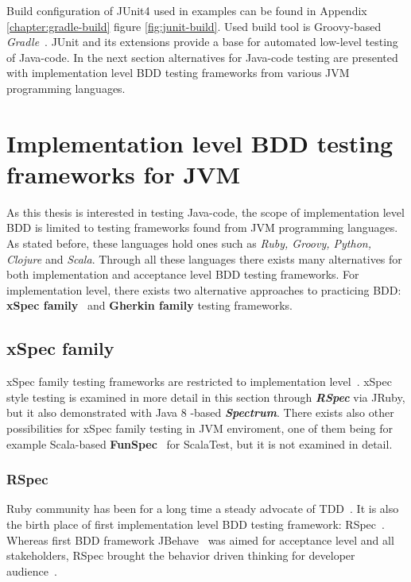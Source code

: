     Build configuration of JUnit4 used in examples can be found in Appendix \ref{chapter:gradle-build} figure \ref{fig:junit-build}.
    Used build tool is Groovy-based \textit{Gradle}~\cite{gradle}.
    JUnit and its extensions provide a base for automated low-level testing of Java-code.
    In the next section alternatives for Java-code testing are presented with implementation level BDD testing frameworks from
    various JVM programming languages.

\section{Implementation level BDD testing frameworks for JVM}
    As this thesis is interested in testing Java-code, the scope of implementation level BDD is limited to testing frameworks
    found from JVM programming languages. As stated before, these languages hold ones such as \textit{Ruby, Groovy, Python,
    Clojure} and \textit{Scala}. Through all these languages there exists many alternatives for both implementation and
    acceptance level BDD testing frameworks. For implementation level, there exists two alternative approaches to practicing
    BDD: \textbf{xSpec family}~\cite{solis2011study} and \textbf{Gherkin family} testing frameworks.

    \subsection{xSpec family}
    xSpec family testing frameworks are restricted to implementation level~\cite{solis2011study}. xSpec style testing
    is examined in more detail in this section through \textbf{\textit{RSpec}} via JRuby, but it also demonstrated with
    Java 8 -based \textbf{\textit{Spectrum}}. There exists also other possibilities for xSpec family testing in JVM enviroment,
    one of them being for example Scala-based \textbf{FunSpec}~\cite{funspec} for ScalaTest, but it is not examined in detail.

    \subsubsection{RSpec}
    Ruby community has been for a long time a steady advocate of TDD~\cite{lerner2009forge}. It is also the birth place
    of first implementation level BDD testing framework: RSpec~\cite{astels2006new}. Whereas first BDD framework
    JBehave~\cite{bdd2006north} was aimed for acceptance level and all stakeholders, RSpec brought the behavior driven thinking for developer
    audience~\cite{astels2006new}.


